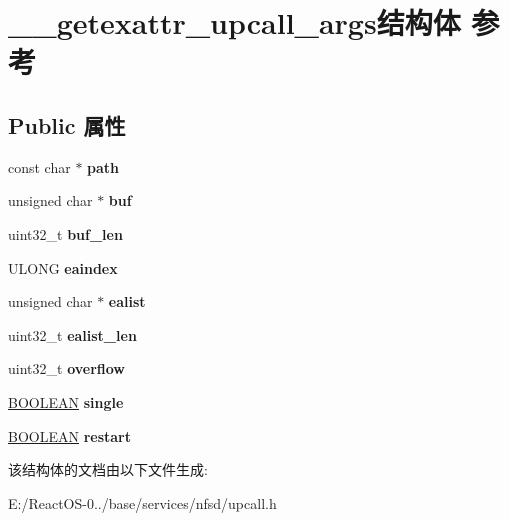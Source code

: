 \hypertarget{struct____getexattr__upcall__args}{}\section{\+\_\+\+\_\+getexattr\+\_\+upcall\+\_\+args结构体 参考}
\label{struct____getexattr__upcall__args}
\subsection*{Public 属性}
\begin{DoxyCompactItemize}
\item 
\mbox{\label{struct____getexattr__upcall__args_a59f46abd91f3bc13da15d472208b45f4}} 
const char $\ast$ {\bfseries path}
\item 
\mbox{\label{struct____getexattr__upcall__args_af34ac7765636451b10c2ea79e824a9d5}} 
unsigned char $\ast$ {\bfseries buf}
\item 
\mbox{\label{struct____getexattr__upcall__args_a732deff54870c3f3a02c932b977ee5bc}} 
uint32\+\_\+t {\bfseries buf\+\_\+len}
\item 
\mbox{\label{struct____getexattr__upcall__args_ac3e88165d323866d2604f8e371bdfb95}} 
U\+L\+O\+NG {\bfseries eaindex}
\item 
\mbox{\label{struct____getexattr__upcall__args_a914e8a38e5a03bff2264ac92820f176a}} 
unsigned char $\ast$ {\bfseries ealist}
\item 
\mbox{\label{struct____getexattr__upcall__args_a7ad919fa285d642e5383d9198de9dcff}} 
uint32\+\_\+t {\bfseries ealist\+\_\+len}
\item 
\mbox{\label{struct____getexattr__upcall__args_a2be0bdd40085b83b3df16940f9e86ada}} 
uint32\+\_\+t {\bfseries overflow}
\item 
\mbox{\label{struct____getexattr__upcall__args_a4aa1ea288dc2eecc48b4b21ca633ca1e}} 
\hyperlink{_processor_bind_8h_a112e3146cb38b6ee95e64d85842e380a}{B\+O\+O\+L\+E\+AN} {\bfseries single}
\item 
\mbox{\label{struct____getexattr__upcall__args_abe66581d186c08920ab237e485f04e06}} 
\hyperlink{_processor_bind_8h_a112e3146cb38b6ee95e64d85842e380a}{B\+O\+O\+L\+E\+AN} {\bfseries restart}
\end{DoxyCompactItemize}


该结构体的文档由以下文件生成\+:\begin{DoxyCompactItemize}
\item 
E\+:/\+React\+O\+S-\/0../base/services/nfsd/upcall.\+h\end{DoxyCompactItemize}
